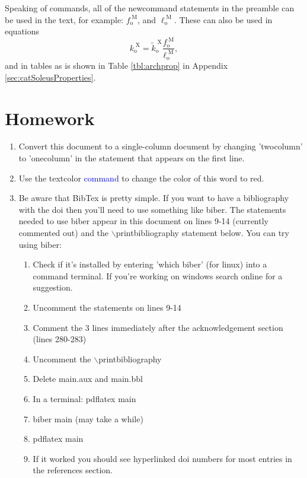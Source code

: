 \documentclass[11pt,twocolumn,a4paper]{article}
\newcommand{\fiso}{f_{\mathrm{o}}^{\;\!\mathrm{M}}}
\newcommand{\kxiso}{k_{\mathrm{o}}^{\;\!\mathrm{X}}}
\newcommand{\kxisoNorm}{\tilde{k}_{\mathrm{o}}^{\;\!\mathrm{X}}}
\newcommand{\lopt}{\ell_{\mathrm{o}}^{\;\!\mathrm{M}}}
\begin{document}
Speaking of commands, all of the newcommand statements in the preamble can be used in the text, for example: $\fiso$, and $\lopt$. These can also be used in equations
\begin{equation}
\kxiso = \kxisoNorm \dfrac{\fiso}{\lopt},  \label{eqn:xbridgeStiffness}
\end{equation}
and in tables as is shown in Table \ref{tbl:archprop} in Appendix \ref{sec:catSoleusProperties}.


\section{Homework}

\begin{enumerate}
\item Convert this document to a single-column document by changing 'twocolumn' to 'onecolumn' in the statement that appears on the first line.
\item  Use the textcolor \textcolor{blue}{command} to change the color of this word to red.
\item Be aware that BibTex is pretty simple. If you want to have a bibliography with the doi then you'll need to use something like biber. The statements needed to use biber appear in this document on lines 9-14 (currently commented out) and the $\backslash$printbibliography statement below. You can try using biber:
\begin{enumerate}
    \item Check if it's installed by entering 'which biber' (for linux) into a command terminal. If you're working on windows search online for a suggestion.
    \item Uncomment the statements on lines 9-14
    \item Comment the 3 lines immediately after the acknowledgement section (lines 280-283)
    \item Uncomment the $\backslash$printbibliography
    \item Delete main.aux and main.bbl
    \item In a terminal: pdflatex main
    \item biber main (may take a while)
    \item pdflatex main
    \item If it worked you should see hyperlinked doi numbers for most entries in the references section.
\end{enumerate}

\end{enumerate}
\end{document}
